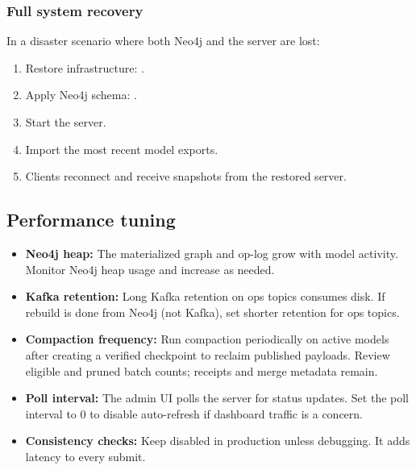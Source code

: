 \subsubsection{Full system recovery}

In a disaster scenario where both Neo4j and the server are lost:

\begin{enumerate}
\item Restore infrastructure: .
\item Apply Neo4j schema: .
\item Start the server.
\item Import the most recent model exports.
\item Clients reconnect and receive snapshots from the restored server.
\end{enumerate}

\subsection{Performance tuning}

\begin{itemize}
\item \textbf{Neo4j heap:} The materialized graph and op-log grow with model
  activity. Monitor Neo4j heap usage and increase 
  as needed.
\item \textbf{Kafka retention:} Long Kafka retention on ops topics consumes
  disk. If rebuild is done from Neo4j (not Kafka), set shorter retention
  for ops topics.
\item \textbf{Compaction frequency:} Run compaction periodically on active
  models after creating a verified checkpoint to reclaim published payloads.
  Review eligible and pruned batch counts; receipts and merge metadata remain.
\item \textbf{Poll interval:} The admin UI polls the server for status
  updates. Set the poll interval to 0 to disable auto-refresh if dashboard
  traffic is a concern.
\item \textbf{Consistency checks:} Keep 
  disabled in production unless debugging. It adds latency to every submit.
\end{itemize}
